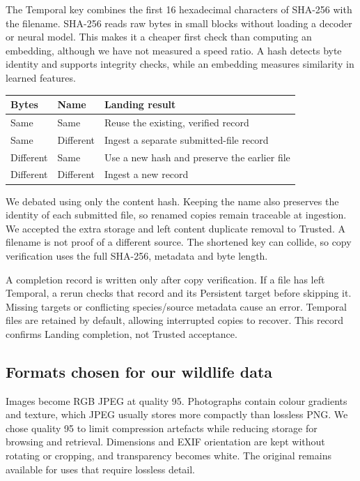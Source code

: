 \documentclass[10pt,a4paper]{article}
\begin{document}
The Temporal key combines the first 16 hexadecimal characters of SHA-256 with the filename. SHA-256 reads raw bytes in small blocks without loading a decoder or neural model. This makes it a cheaper first check than computing an embedding, although we have not measured a speed ratio. A hash detects byte identity and supports integrity checks, while an embedding measures similarity in learned features.

\begin{tabularx}{\linewidth}{@{}l l Y@{}}\toprule
Bytes & Name & Landing result\\\midrule
Same & Same & Reuse the existing, verified record\\
Same & Different & Ingest a separate submitted-file record\\
Different & Same & Use a new hash and preserve the earlier file\\
Different & Different & Ingest a new record\\\bottomrule
\end{tabularx}

We debated using only the content hash. Keeping the name also preserves the identity of each submitted file, so renamed copies remain traceable at ingestion. We accepted the extra storage and left content duplicate removal to Trusted. A filename is not proof of a different source. The shortened key can collide, so copy verification uses the full SHA-256, metadata and byte length.

A completion record is written only after copy verification. If a file has left Temporal, a rerun checks that record and its Persistent target before skipping it. Missing targets or conflicting species/source metadata cause an error. Temporal files are retained by default, allowing interrupted copies to recover. This record confirms Landing completion, not Trusted acceptance.

\subsection*{Formats chosen for our wildlife data}
Images become RGB JPEG at quality 95. Photographs contain colour gradients and texture, which JPEG usually stores more compactly than lossless PNG. We chose quality 95 to limit compression artefacts while reducing storage for browsing and retrieval. Dimensions and EXIF orientation are kept without rotating or cropping, and transparency becomes white. The original remains available for uses that require lossless detail.
\end{document}
